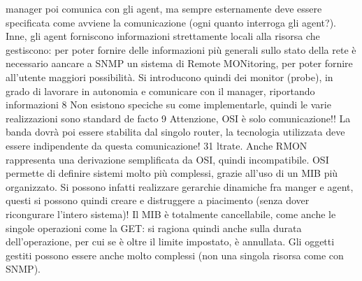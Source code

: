 manager poi comunica con gli agent, ma sempre esternamente deve essere specificata come avviene la comunicazione (ogni
quanto interroga gli agent?). Inne,
gli agent forniscono informazioni strettamente locali alla risorsa che gestiscono:
per poter fornire delle informazioni più generali sullo stato della rete è necessario
aancare a SNMP un sistema di Remote MONitoring, per poter fornire all'utente maggiori possibilità. Si introducono quindi
dei monitor (probe), in grado
di lavorare in autonomia e comunicare con il manager, riportando informazioni
8 Non esistono speciche su come implementarle, quindi le varie realizzazioni sono standard
de facto
9 Attenzione, OSI è solo comunicazione!! La banda dovrà poi essere stabilita dal singolo
router, la tecnologia utilizzata deve essere indipendente da questa comunicazione!
31
ltrate. Anche RMON rappresenta una derivazione semplificata da OSI, quindi
incompatibile.
OSI permette di definire sistemi molto più complessi, grazie all'uso di un MIB
più organizzato. Si possono infatti realizzare gerarchie dinamiche fra manger e
agent, questi si possono quindi creare e distruggere a piacimento (senza dover
ricongurare l'intero sistema)! Il MIB è totalmente cancellabile, come anche le
singole operazioni come la GET: si ragiona quindi anche sulla durata dell'operazione, per cui se è oltre il limite
impostato, è annullata. Gli oggetti gestiti
possono essere anche molto complessi (non una singola risorsa come con SNMP).
